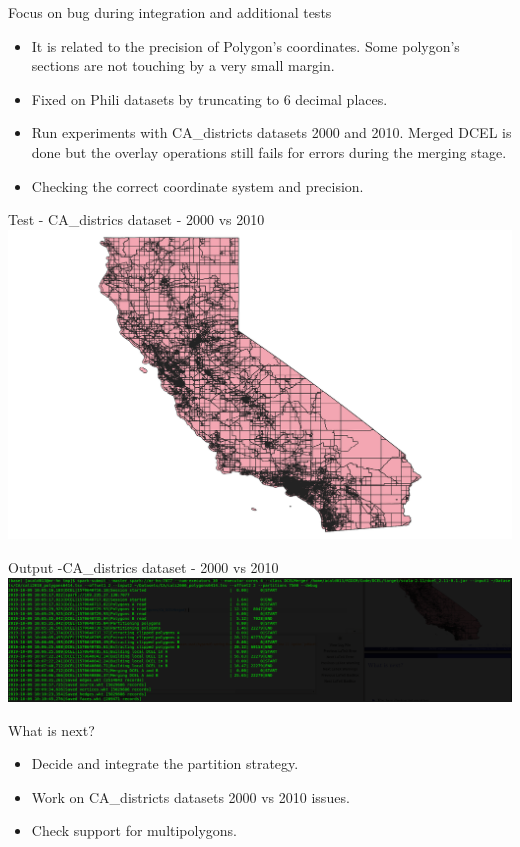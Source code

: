\documentclass{beamer}
\begin{document}
\begin{frame}{Focus on bug during integration and additional tests}
    \begin{itemize}
        \item It is related to the precision of Polygon's coordinates.  Some polygon's sections are not touching by a very small margin.  
        \item Fixed on Phili datasets by truncating to 6 decimal places.
        \item Run experiments with CA\_districts datasets 2000 and 2010. Merged DCEL is done but the overlay operations still fails for errors during the merging stage.
        \item Checking the correct coordinate system and precision.
    \end{itemize}
\end{frame}

\begin{frame}{Test - CA\_districs dataset - 2000 vs 2010}
    \centering 
    \includegraphics[width=\linewidth]{figures/CA_DCELMerged} 
\end{frame}

\begin{frame}{Output -CA\_districs dataset - 2000 vs 2010}
    \centering 
    \includegraphics[width=\linewidth]{figures/CA_Test_Output} 
\end{frame}

\begin{frame}{What is next?}
    \begin{itemize}
        \item Decide and integrate the partition strategy.
        \item Work on CA\_districts datasets 2000 vs 2010 issues.
        \item Check support for multipolygons.
    \end{itemize}
\end{frame}
\end{document}
